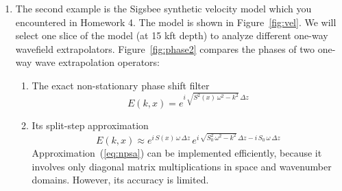 \begin{enumerate}


\lstset{language=python,numbers=left,numberstyle=\tiny,showstringspaces=false}
{\small }

\lstset{language=c,numbers=left,numberstyle=\tiny,showstringspaces=false}
{\small }

\newpage

\item The second example is the Sigsbee synthetic velocity model which
  you encountered in Homework 4. The model is shown in
  Figure~\ref{fig:vel}. We will select one slice of the model (at 15
  kft depth) to analyze different one-way wavefield
  extrapolators. Figure~\ref{fig:phase2} compares the phases of two one-way wave
  extrapolation operators:
  \begin{enumerate}
  \item The exact non-stationary phase shift filter
    \begin{equation}
      \label{eq:nps}
      E(k,x) = e^{i\,\sqrt{S^2(x)\,\omega^2 - k^2}\,\Delta z}
    \end{equation}
  \item Its split-step approximation
    \begin{equation}
      \label{eq:npsa}
      E(k,x) \approx e^{i\,S(x)\,\omega\,\Delta z}\,e^{i\,\sqrt{S_0^2\,\omega^2 - k^2}\,\Delta z-i\,S_0\,\omega\,\Delta z}
    \end{equation}
    Approximation~(\ref{eq:npsa}) can be implemented efficiently, because it involves
    only diagonal matrix multiplications in space and wavenumber domains. However, its accuracy is limited.
  \end{enumerate}   
  

\end{enumerate}
